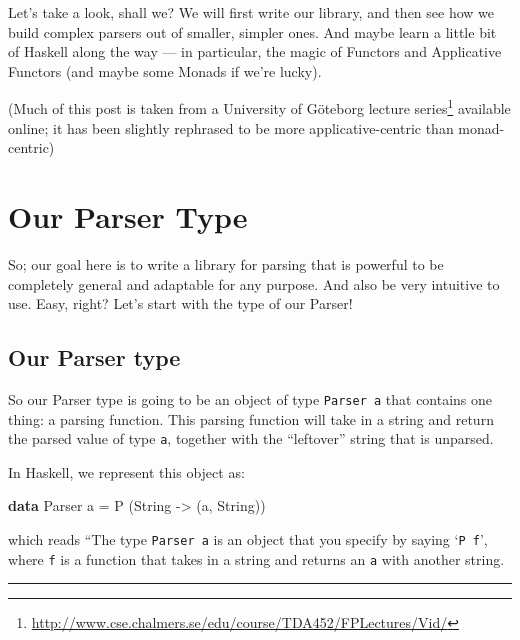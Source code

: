 \documentclass[]{article}
\newenvironment{Shaded}{}{}
\newcommand{\DataTypeTok}[1]{\textcolor[rgb]{0.56,0.13,0.00}{#1}}
\newcommand{\KeywordTok}[1]{\textcolor[rgb]{0.00,0.44,0.13}{\textbf{#1}}}
\newcommand{\NormalTok}[1]{#1}
\newcommand{\OtherTok}[1]{\textcolor[rgb]{0.00,0.44,0.13}{#1}}
\renewcommand{\href}[2]{#2\footnote{\url{#1}}}
\begin{document}
Let's take a look, shall we? We will first write our library, and then see how
we build complex parsers out of smaller, simpler ones. And maybe learn a little
bit of Haskell along the way --- in particular, the magic of Functors and
Applicative Functors (and maybe some Monads if we're lucky).

(Much of this post is taken from a University of Göteborg
\href{http://www.cse.chalmers.se/edu/course/TDA452/FPLectures/Vid/}{lecture
series} available online; it has been slightly rephrased to be more
applicative-centric than monad-centric)

\section{Our Parser Type}\label{our-parser-type}

So; our goal here is to write a library for parsing that is powerful to be
completely general and adaptable for any purpose. And also be very intuitive to
use. Easy, right? Let's start with the type of our Parser!

\subsection{Our Parser type}\label{our-parser-type-1}

So our Parser type is going to be an object of type \texttt{Parser\ a} that
contains one thing: a parsing function. This parsing function will take in a
string and return the parsed value of type \texttt{a}, together with the
``leftover'' string that is unparsed.

In Haskell, we represent this object as:

\begin{Shaded}
\begin{Highlighting}[]
\KeywordTok{data} \DataTypeTok{Parser}\NormalTok{ a }\OtherTok{=} \DataTypeTok{P}\NormalTok{ (}\DataTypeTok{String} \OtherTok{{-}\textgreater{}}\NormalTok{ (a, }\DataTypeTok{String}\NormalTok{))}
\end{Highlighting}
\end{Shaded}

which reads ``The type \texttt{Parser\ a} is an object that you specify by
saying `\texttt{P\ f}', where \texttt{f} is a function that takes in a string
and returns an \texttt{a} with another string.

\begin{center}\rule{0.5\linewidth}{0.5pt}\end{center}
\end{document}
